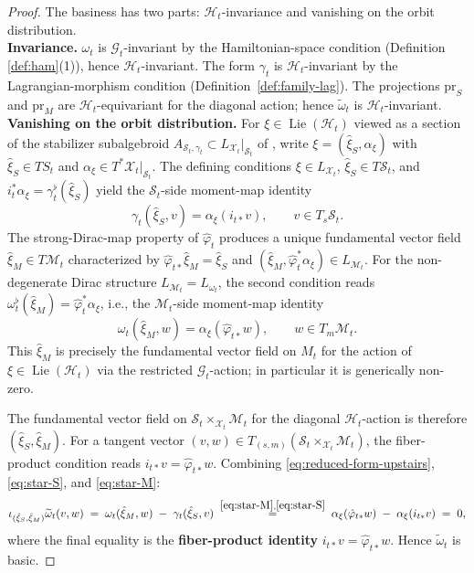 \documentclass[reqno]{amsart}
\theoremstyle{plain}
\theoremstyle{definition}
\newcommand{\G}{\mathcal{G}}
\renewcommand{\H}{\mathcal{H}}
\renewcommand{\S}{\mathcal{S}}
\newcommand{\M}{\mathcal{M}}
\newcommand{\X}{\mathcal{X}}
\newcommand{\Lie}{\operatorname{Lie}}
\begin{document}
\begin{proof}
The basiness has two parts: $\H_t$-invariance and vanishing on the orbit distribution.\\

 
\noindent\textbf{Invariance.} $\omega_t$ is $\mathcal{G}_t$-invariant by the
Hamiltonian-space condition (Definition \ref{def:ham}(1)),
hence $\H_t$-invariant. The form $\gamma_t$ is $\H_t$-invariant by the Lagrangian-morphism condition (Definition~\ref{def:family-lag}).
The projections $\mathrm{pr}_S$ and $\mathrm{pr}_M$ are $\H_t$-equivariant for the diagonal action; hence $\widetilde\omega_t$ is $\H_t$-invariant.\\
 
\noindent\textbf{Vanishing on the orbit distribution.}
For $\xi \in \Lie(\H_t)$ viewed as a section of the stabilizer
subalgebroid $A_{\S_t,\gamma_t} \subset L_{\X_t}|_{\S_t}$ of
\cite[Definition 2.1]{bualibanu2026reduction}, write $\xi = (\hat\xi_S, \alpha_\xi)$
with $\hat\xi_S \in TS_t$ and $\alpha_\xi \in T^{*}\X_t|_{\S_t}$. The defining conditions $\xi \in L_{\X_t}$, $\hat\xi_S \in T\S_t$, and
$i_t^{*}\alpha_\xi = \gamma_t^\flat(\hat\xi_S)$ yield the $\S_t$-side
moment-map identity
\begin{equation}\label{eq:star-S}
   \gamma_t(\hat\xi_S, v) = \alpha_\xi(i_{t*}v),
   \qquad v \in T_s \S_t.
   \tag{$\star$}
\end{equation}
The strong-Dirac-map property of $\hat\varphi_t$
\cite[Corollary~3.12]{bursztyn2005dirac} produces a unique fundamental vector field $\hat\xi_M \in T\M_t$ characterized by
$\hat\varphi_{t*}\hat\xi_M = \hat\xi_S$ and
$(\hat\xi_M, \hat\varphi_t^{*}\alpha_\xi) \in L_{\M_t}$. For the
non-degenerate Dirac structure $L_{\M_t} = L_{\omega_t}$, the second condition reads $\omega_t^\flat(\hat\xi_M) = \hat\varphi_t^{*}\alpha_\xi$,
i.e., the $\M_t$-side moment-map identity
\begin{equation}\label{eq:star-M}
   \omega_t(\hat\xi_M, w) = \alpha_\xi(\hat\varphi_{t*}w),
   \qquad w \in T_m \M_t.
   \tag{$\star\star$}
\end{equation}
This $\hat\xi_M$ is precisely the fundamental vector field on $M_t$ for
the action of $\xi \in \Lie(\H_t)$ via the restricted $\G_t$-action; in particular it is generically non-zero.
 
The fundamental vector field on $\S_t \times_{\X_t} \M_t$ for the diagonal $\H_t$-action is therefore $(\hat\xi_S, \hat\xi_M)$. For a tangent vector
$(v, w) \in T_{(s, m)}(\S_t \times_{\X_t} \M_t)$, the fiber-product
condition reads $i_{t*}v = \hat\varphi_{t*}w$. Combining
\eqref{eq:reduced-form-upstairs}, \eqref{eq:star-S}, and
\eqref{eq:star-M}:
\[
   \iota_{(\hat\xi_S, \hat\xi_M)}\widetilde\omega_t(v, w)
   \;=\; \omega_t(\hat\xi_M, w) \;-\; \gamma_t(\hat\xi_S, v)
   \;\stackrel{\eqref{eq:star-M},\eqref{eq:star-S}}{=}\;
   \alpha_\xi(\hat\varphi_{t*}w) \;-\; \alpha_\xi(i_{t*}v)
   \;=\; 0,
\]
where the final equality is the \textbf{fiber-product identity}
$i_{t*}v = \hat\varphi_{t*}w$. Hence $\widetilde\omega_t$ is basic.
 

\end{proof}
\end{document}
